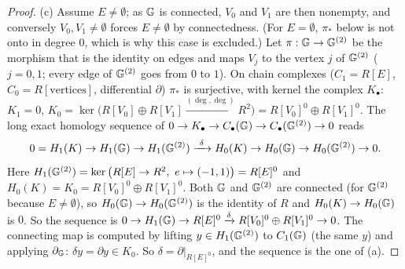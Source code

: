 \begin{proof}
(c) Assume $E\ne\emptyset$; as $\mathbb{G}$ is connected, $V_0$ and $V_1$ are then nonempty, and conversely $V_0,V_1\ne\emptyset$ forces $E\ne\emptyset$ by
connectedness. (For $E=\emptyset$, $\pi_*$ below is not onto in degree $0$, which is why this case is excluded.) Let $\pi:\mathbb{G}\to\mathbb{G}^{(2)}$ be the morphism that is the identity on edges and maps $V_j$ to the vertex $j$ of $\mathbb{G}^{(2)}$ ($j=0,1$; every edge of
$\mathbb{G}^{(2)}$ goes from $0$ to $1$). On chain complexes ($C_1=R[E]$, $C_0=R[\text{vertices}]$, differential $\partial$) $\pi_*$ is surjective, with kernel
the complex $K_\bullet$: $K_1=0$, $K_0=\ker\big(R[V_0]\oplus R[V_1]\xrightarrow{(\deg,\deg)}R^2\big)=R[V_0]^0\oplus R[V_1]^0$. The long exact homology
sequence of $0\to K_\bullet\to C_\bullet(\mathbb{G})\to C_\bullet(\mathbb{G}^{(2)})\to0$ reads
\[0=H_1(K)\to H_1(\mathbb{G})\to H_1(\mathbb{G}^{(2)})\xrightarrow{\ \delta\ }H_0(K)\to H_0(\mathbb{G})\to H_0(\mathbb{G}^{(2)})\to0 .\]
Here $H_1(\G^{(2)})=\ker\big(R[E]\to R^2,\ e\mapsto(-1,1)\big)=R[E]^0$ and $H_0(K)=K_0=R[V_0]^0\oplus R[V_1]^0$. Both $\mathbb{G}$ and $\mathbb{G}^{(2)}$ are connected (for
$\mathbb{G}^{(2)}$ because $E\ne\emptyset$), so $H_0(\mathbb{G})\to H_0(\mathbb{G}^{(2)})$ is the identity of
$R$ and $H_0(K)\to H_0(\mathbb{G})$ is $0$. So the sequence is $0\to H_1(\mathbb{G})\to R[E]^0\xrightarrow{\delta}R[V_0]^0\oplus R[V_1]^0\to0$. The connecting map is
computed by lifting $y\in H_1(\mathbb{G}^{(2)})$ to $C_1(\mathbb{G})$ (the same $y$) and applying $\partial_{\mathbb{G}}$: $\delta y=\partial y\in K_0$. So
$\delta=\partial|_{R[E]^0}$, and the sequence is the one of (a).
\end{proof}

